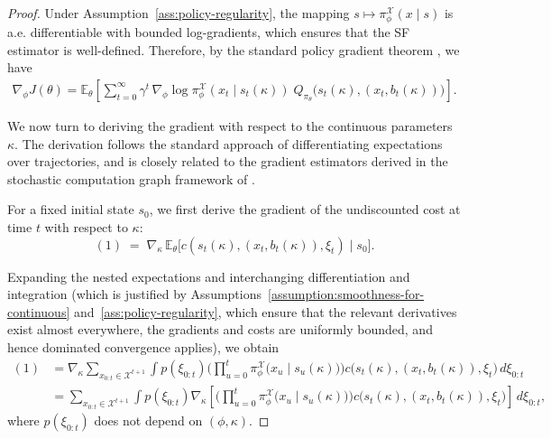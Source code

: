 \documentclass{article}
\theoremstyle{definition}
\theoremstyle{remark}
\begin{document}
\begin{proof}

Under Assumption~\ref{ass:policy-regularity}, the mapping
$s \mapsto \pi^{\mathcal{X}}_{\phi}(x \mid s)$ is a.e.
differentiable with bounded log-gradients, which ensures that the SF
estimator is well-defined. Therefore, by the standard policy gradient theorem \citep{sutton1999policy}, we have
\begin{align}
\nabla_\phi J(\theta)
=
\mathbb{E}_{\theta}\!\left[
\sum_{t=0}^{\infty}
\gamma^{t}\,
\nabla_{\phi}\log \pi^{\mathcal{X}}_{\phi}\left(x_t \mid s_t(\kappa)\right)\;
Q_{\pi_{\theta}}\bigl(s_t(\kappa), (x_t, b_t(\kappa))\bigr)
\right].
\end{align}

We now turn to deriving the gradient with respect to the continuous parameters~$\kappa$. The derivation follows the standard approach of differentiating expectations
over trajectories, and is closely related to the gradient estimators derived
in the stochastic computation graph framework of \citet{schulman2015gradient}.

For a fixed initial state $s_0$, we first derive the gradient of the
undiscounted cost at time $t$ with respect to $\kappa$:
\begin{equation}
(1)
\;=\;
\nabla_{\kappa}\,
\mathbb{E}_{\theta}\!\big[
c(s_t(\kappa), (x_t, b_t(\kappa)), \xi_t)
\mid s_0
\big].
\label{eq:single-cost-grad}
\end{equation}

Expanding the nested expectations and interchanging differentiation and integration 
(which is justified by Assumptions~\ref{assumption:smoothness-for-continuous} and~\ref{ass:policy-regularity}, 
which ensure that the relevant derivatives exist almost everywhere, the gradients and costs are uniformly bounded, and hence dominated convergence applies), we obtain
\begin{align*}
(1)
&=
\nabla_{\kappa}
\sum_{x_{0:t} \in \mathcal{X}^{t+1}}
\int
p(\xi_{0:t})
\Bigg(
\prod_{u=0}^{t}
\pi^{\mathcal{X}}_{\phi}\bigl(x_u \mid s_u(\kappa)\bigr)
\Bigg)
c\big(s_t(\kappa), (x_t, b_t(\kappa)), \xi_t\big)
\,d\xi_{0:t}
\\[4pt]
&=
\sum_{x_{0:t} \in \mathcal{X}^{t+1}}
\int
p(\xi_{0:t})
\nabla_{\kappa}
\!\left[
\Bigg(\prod_{u=0}^{t} \pi^{\mathcal{X}}_{\phi}\bigl(x_u \mid s_u(\kappa)\bigr)\Bigg)
c\big(s_t(\kappa), (x_t, b_t(\kappa)), \xi_t\big)
\right]
\,d\xi_{0:t},
\end{align*}
where $p(\xi_{0:t})$ does not depend on $(\phi,\kappa)$.


\end{proof}
\end{document}
